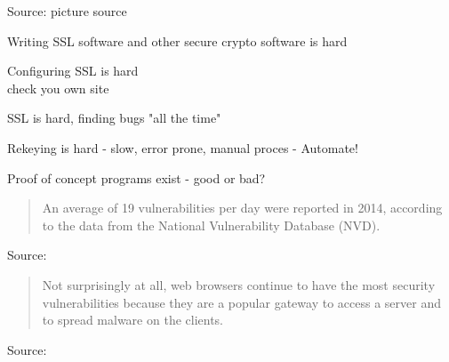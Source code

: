 \documentclass[20pt,landscape,a4paper]{foils}
\begin{document}

Source: picture source\\ {\footnotesize{}}
\begin{list2}
\item Writing SSL software and other secure crypto software is hard
\item Configuring SSL is hard\\
check you own site 
\item SSL is hard, finding bugs "all the time"
\item Rekeying is hard - slow, error prone, manual proces - Automate!
\item Proof of concept programs exist - good or bad?
\end{list2}




\begin{quote}
An average of 19 vulnerabilities per day were reported in 2014, according to the data from the National Vulnerability Database (NVD).
\end{quote}

Source:\\
{\footnotesize
{}}




\begin{quote}\small
Not surprisingly at all, web browsers continue to have the most security vulnerabilities because they are a popular gateway to access a server and to spread malware on the clients.
\end{quote}

Source:\\
{\footnotesize
{}}



\end{document}

